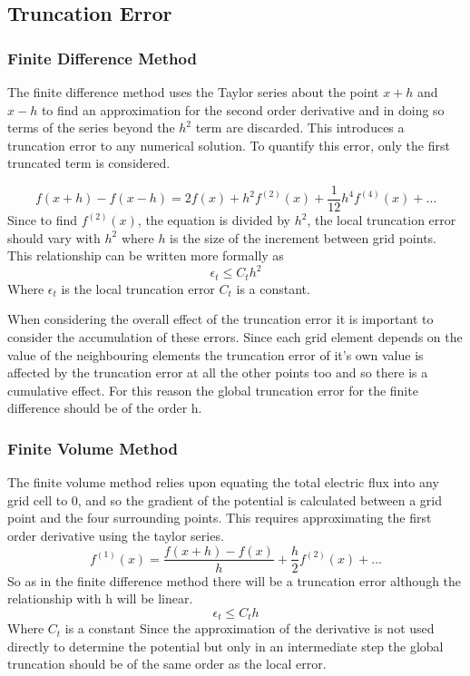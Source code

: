 \documentclass[aps,twocolumn,pre,nofootinbib,10pt]{revtex4-1}
\begin{document}
\subsection{Truncation Error}

\subsubsection{Finite Difference Method}

The finite difference method uses the Taylor series about the point \(x+h\) and \(x-h\) to find an approximation for the second order derivative and in doing so terms of the series beyond the \(h^2\) term are discarded. This introduces a truncation error to any numerical solution. To quantify this error, only the first truncated term is considered. 

\[f(x+h)-f(x-h) = 2f(x) + h^2f^{(2)}(x) + \frac{1}{12}h^4f^{(4)}(x) + \dots \]
Since to find \(f^{(2)}(x) \), the equation is divided by \(h^2\), the local truncation error should vary with \(h^2\) where \(h\) is the size of the increment between grid points. This relationship can be written more formally as
\[\epsilon_{t} \leq C_th^2 \]
Where \(\epsilon_{t}\) is the local truncation error \(C_t\) is a constant.

When considering the overall effect of the truncation error it is important to consider the accumulation of these errors. Since each grid element depends on the value of the neighbouring elements the truncation error of it's own value is affected by the truncation error at all the other points too and so there is a cumulative effect. For this reason the global truncation error for the finite difference should be of the order h.


\subsubsection{Finite Volume Method}

The finite volume method relies upon equating the total electric flux into any grid cell to 0, and so the gradient of the potential is calculated between a grid point and the four surrounding points. This requires approximating the first order derivative using the taylor series.
\[f^{(1)}(x) = \frac{f(x+h) - f(x)}{h} + \frac{h}{2}f^{(2)}(x) + \dots\]
So as in the finite difference method there will be a truncation error although the relationship with h will be linear.
\[\epsilon_t \leq C_th \]
Where \(C_t\) is a constant
Since the approximation of the derivative is not used directly to determine the potential but only in an intermediate step the global truncation should be of the same order as the local error.
\end{document}
